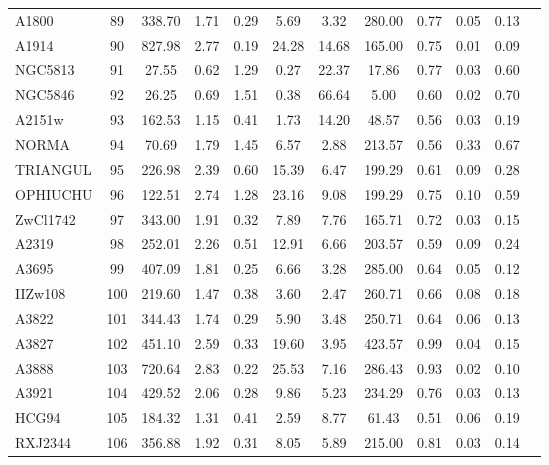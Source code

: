 \documentclass[10pt,aps,pra,reprint,amsmath,amsfonts,amssymb,showpacs,nofootinbib,floatfix]{revtex4-1}
\begin{document}
\begin{table}
\begin{minipage}{2.0\columnwidth}
\begin{tabular}{l  c c c c c c c c c c c}
$$A1800    &  89 & 338.70 &   1.71 &   0.29 &   5.69 &   3.32 & 280.00 &   0.77 &   0.05 &   0.13 \\
A1914    &  90 & 827.98 &   2.77 &   0.19 &  24.28 &  14.68 & 165.00 &   0.75 &   0.01 &   0.09 \\
NGC5813  &  91 &  27.55 &   0.62 &   1.29 &   0.27 &  22.37 &  17.86 &   0.77 &   0.03 &   0.60 \\
NGC5846  &  92 &  26.25 &   0.69 &   1.51 &   0.38 &  66.64 &   5.00 &   0.60 &   0.02 &   0.70 \\
A2151w   &  93 & 162.53 &   1.15 &   0.41 &   1.73 &  14.20 &  48.57 &   0.56 &   0.03 &   0.19 \\
NORMA    &  94 &  70.69 &   1.79 &   1.45 &   6.57 &   2.88 & 213.57 &   0.56 &   0.33 &   0.67 \\
TRIANGUL &  95 & 226.98 &   2.39 &   0.60 &  15.39 &   6.47 & 199.29 &   0.61 &   0.09 &   0.28 \\
OPHIUCHU &  96 & 122.51 &   2.74 &   1.28 &  23.16 &   9.08 & 199.29 &   0.75 &   0.10 &   0.59 \\
ZwCl1742 &  97 & 343.00 &   1.91 &   0.32 &   7.89 &   7.76 & 165.71 &   0.72 &   0.03 &   0.15 \\
A2319    &  98 & 252.01 &   2.26 &   0.51 &  12.91 &   6.66 & 203.57 &   0.59 &   0.09 &   0.24 \\
A3695    &  99 & 407.09 &   1.81 &   0.25 &   6.66 &   3.28 & 285.00 &   0.64 &   0.05 &   0.12 \\
IIZw108  & 100 & 219.60 &   1.47 &   0.38 &   3.60 &   2.47 & 260.71 &   0.66 &   0.08 &   0.18 \\
A3822    & 101 & 344.43 &   1.74 &   0.29 &   5.90 &   3.48 & 250.71 &   0.64 &   0.06 &   0.13 \\
A3827    & 102 & 451.10 &   2.59 &   0.33 &  19.60 &   3.95 & 423.57 &   0.99 &   0.04 &   0.15 \\
A3888    & 103 & 720.64 &   2.83 &   0.22 &  25.53 &   7.16 & 286.43 &   0.93 &   0.02 &   0.10 \\
A3921    & 104 & 429.52 &   2.06 &   0.28 &   9.86 &   5.23 & 234.29 &   0.76 &   0.03 &   0.13 \\
HCG94    & 105 & 184.32 &   1.31 &   0.41 &   2.59 &   8.77 &  61.43 &   0.51 &   0.06 &   0.19 \\
RXJ2344  & 106 & 356.88 &   1.92 &   0.31 &   8.05 &   5.89 & 215.00 &   0.81 &   0.03 &   0.14 \\
\hline
\hline
\end{tabular}
\begin{quote}

\end{quote}
\end{minipage}
\end{table}
\end{document}
